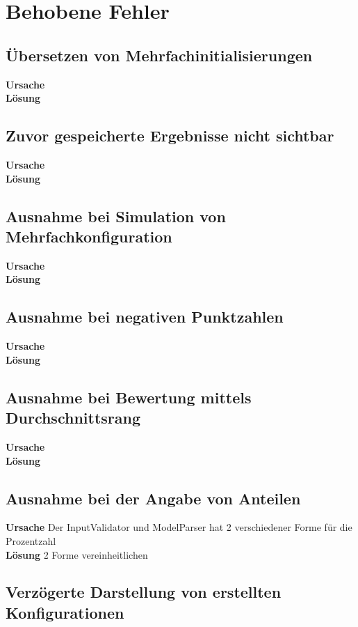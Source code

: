 \section{Behobene Fehler}

\subsection{Übersetzen von Mehrfachinitialisierungen}

\textbf{Ursache}\\
\textbf{Lösung}

\subsection{Zuvor gespeicherte Ergebnisse nicht sichtbar}

\textbf{Ursache}\\
\textbf{Lösung}

\subsection{Ausnahme bei Simulation von Mehrfachkonfiguration}

\textbf{Ursache}\\
\textbf{Lösung}

\subsection{Ausnahme bei negativen Punktzahlen}

\textbf{Ursache}\\
\textbf{Lösung}

\subsection{Ausnahme bei Bewertung mittels Durchschnittsrang}

\textbf{Ursache}\\
\textbf{Lösung}

\subsection{Ausnahme bei der Angabe von Anteilen}

\textbf{Ursache} Der InputValidator und ModelParser hat 2 verschiedener Forme für die Prozentzahl\\
\textbf{Lösung} 2 Forme vereinheitlichen

\subsection{Verzögerte Darstellung von erstellten Konfigurationen}

